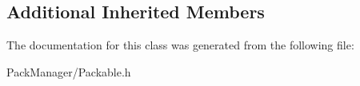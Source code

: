 \subsection*{Additional Inherited Members}


The documentation for this class was generated from the following file\-:\begin{DoxyCompactItemize}
\item 
Pack\-Manager/Packable.\-h\end{DoxyCompactItemize}
